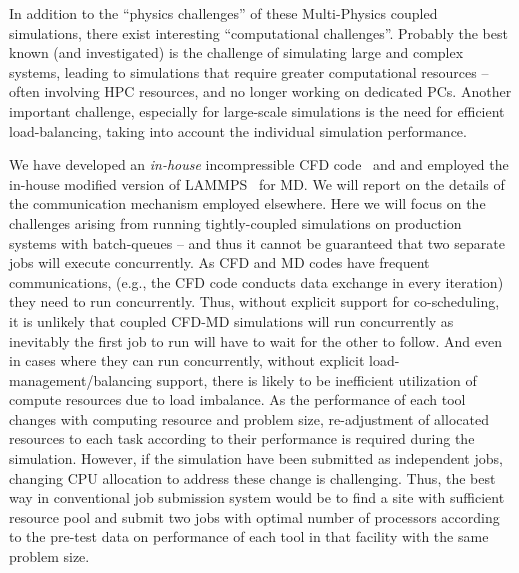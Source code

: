 \documentclass[a4paper]{article}
\begin{document}
In addition to the ``physics challenges'' of these Multi-Physics coupled simulations, there exist interesting ``computational challenges''. Probably the best known (and investigated) is the challenge of simulating large and complex systems, leading to simulations that require greater computational resources -- often involving HPC resources, and no longer working on dedicated PCs. Another important challenge, especially for large-scale simulations is the need for efficient load-balancing, taking into account the individual simulation performance.

We have developed an {\it in-house} incompressible CFD code~\cite{Lee:2006} and and employed the in-house modified version of LAMMPS~\cite{LAMMPS} for MD. We will report on the details of the communication mechanism employed elsewhere. Here we will focus on the challenges arising from running tightly-coupled simulations on production systems with batch-queues -- and thus it cannot be guaranteed that two separate jobs will execute concurrently.  As CFD and MD codes have frequent communications, (e.g., the CFD code conducts data exchange in every iteration) they need to run concurrently.  Thus, without explicit support for co-scheduling, it is unlikely that coupled CFD-MD simulations will run concurrently as inevitably the first job to run will have to wait for the other to follow.
And even in cases where they can run concurrently, without explicit load-management/balancing support, there is likely to be inefficient utilization of compute resources due to load imbalance.  As the performance of each tool changes with computing resource and problem size, re-adjustment of allocated resources to each task according to their performance is required during the simulation. However, if the simulation have been submitted as independent jobs, changing CPU allocation to address these change is challenging. Thus, the best way in conventional job submission system would be to find a site with sufficient resource pool and submit two jobs with optimal number of processors according to the pre-test data on performance of each tool in that facility with the same problem size.
\end{document}
